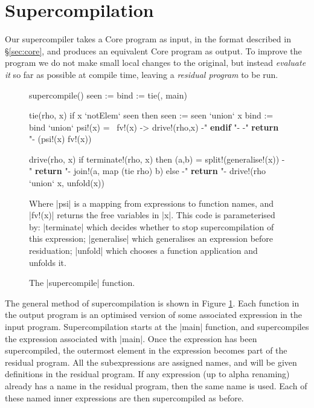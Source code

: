\section{Supercompilation}
\label{sec:optimisation}

Our supercompiler takes a Core program as input, in the format described in \S\ref{sec:core}, and produces an equivalent Core program as output. To improve the program we do not make small local changes to the original, but instead \textit{evaluate it} so far as possible at compile time, leaving a \textit{residual program} to be run.

\begin{figure}
\begin{code}
supercompile()
    seen := {}
    bind := {}
    tie({}, main)

tie(rho, x)
    if x `notElem` seen then
        seen := seen `union` {x}
        bind := bind `union` {psi\!!(x) = \ fv\!!(x) -> drive\!!(rho,x)}
    {-" \textsf{\textbf{endif}} "-}
    {-" \textsf{\textbf{return }} "-} (psi\!!(x) fv\!!(x))

drive(rho, x)
    if terminate\!!(rho, x) then
        (a,b) = split\!!(generalise\!!(x))
        {-" \textsf{\textbf{return }} "-} join\!!(a, map (tie rho) b)
    else
        {-" \textsf{\textbf{return }} "-} drive\!!(rho `union` {x}, unfold(x))
\end{code}

Where |psi| is a mapping from expressions to function names, and |fv\!!(x)| returns the free variables in |x|. This code is parameterised by: |terminate| which decides whether to stop supercompilation of this expression; |generalise| which generalises an expression before residuation; |unfold| which chooses a function application and unfolds it.
\vspace{3mm}
\caption{The |supercompile| function.}
\label{fig:supercompile}
\end{figure}

The general method of supercompilation is shown in Figure \ref{fig:supercompile}. Each function in the output program is an optimised version of some associated expression in the input program. Supercompilation starts at the |main| function, and supercompiles the expression associated with |main|. Once the expression has been supercompiled, the outermost element in the expression becomes part of the residual program. All the subexpressions are assigned names, and will be given definitions in the residual program. If any expression (up to alpha renaming) already has a name in the residual program, then the same name is used. Each of these named inner expressions are then supercompiled as before.


